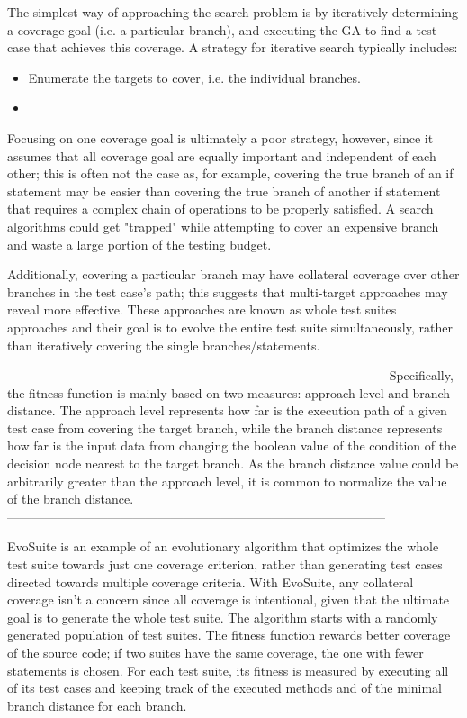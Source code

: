 The simplest way of approaching the search problem is by iteratively determining a coverage goal (i.e. a particular branch), and executing the GA to find a test case that achieves this coverage. 
A strategy for iterative search typically includes:
\begin{itemize}
    \item Enumerate the targets to cover, i.e. the individual branches.
    \item 
\end{itemize}

Focusing on one coverage goal is ultimately a poor strategy, however, since it assumes that all coverage goal are equally important and independent of each other; this is often not the case as, for example, covering the true branch of an if statement may be easier than covering the true branch of another if statement that requires a complex chain of operations to be properly satisfied. A search algorithms could get "trapped" while attempting to cover an expensive branch and waste a large portion of the testing budget.

Additionally, covering a particular branch may have collateral coverage over other branches in the test case's path; this suggests that multi-target approaches may reveal more effective. These approaches are known as whole test suites approaches and their goal is to evolve the entire test suite simultaneously, rather than iteratively covering the single branches/statements.


------------------------------------------------------------------------------------------
Specifically, the fitness function is mainly based on two measures:
approach level and branch distance. The approach level represents how
far is the execution path of a given test case from covering the target branch,
while the branch distance represents how far is the input data from changing the
boolean value of the condition of the decision node nearest to the target branch.
As the branch distance value could be arbitrarily greater than the approach
level, it is common to normalize the value of the branch distance.
------------------------------------------------------------------------------------------

EvoSuite is an example of an evolutionary algorithm that optimizes the whole test suite towards just one coverage criterion, rather than generating test cases directed towards multiple coverage criteria.
With EvoSuite, any collateral coverage isn't a concern since all coverage is intentional, given that the ultimate goal is to generate the whole test suite.
The algorithm starts with a randomly generated population of test suites.
The fitness function rewards better coverage of the source code; if two suites have the same coverage, the one with fewer statements is chosen. For each test suite, its fitness is measured by executing all of its test cases and keeping track of the executed methods and of the minimal branch distance for each branch.

